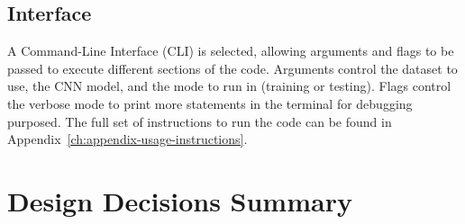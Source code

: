 \subsection{Interface}

A Command-Line Interface (CLI) is selected, allowing arguments and flags to be passed to execute different sections of the code. Arguments control the dataset to use, the CNN model, and the mode to run in (training or testing). Flags control the verbose mode to print more statements in the terminal for debugging purposed. The full set of instructions to run the code can be found in Appendix~\ref{ch:appendix-usage-instructions}.


\section{Design Decisions Summary}

